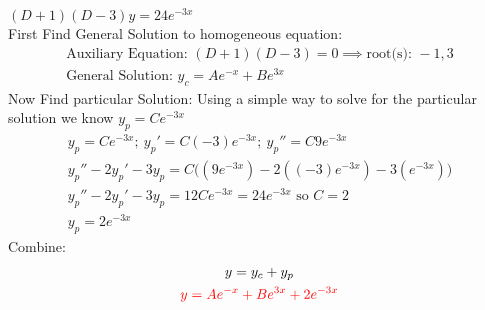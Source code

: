 \item [4.] $(D+1)(D-3)y=24e^{-3x}$\\[2mm]
First Find General Solution to homogeneous equation:
\begin{gather*}
    \text{Auxiliary Equation: } (D+1)(D-3)=0 \implies \text{root(s): } -1,3\\
    \text{General Solution: } y_c=Ae^{-x}+Be^{3x}
\end{gather*}
Now Find particular Solution:
Using a simple way to solve for the particular solution we know $y_p=Ce^{-3x}$
\begin{gather*}
    y_p=Ce^{-3x};\:y_p'=C(-3)e^{-3x};\:y_p''=C9e^{-3x}\\
    y_p''-2y_p'-3y_p=C\big((9e^{-3x})-2((-3)e^{-3x})-3(e^{-3x})\big)\\
    y_p''-2y_p'-3y_p=12Ce^{-3x} = 24e^{-3x} \text{ so } C=2\\
    y_p = 2e^{-3x}
\end{gather*}
Combine:
\begin{gather*}
    y=y_c+y_p\\
    \textcolor{red}{y = Ae^{-x}+Be^{3x}+2e^{-3x}}
\end{gather*}